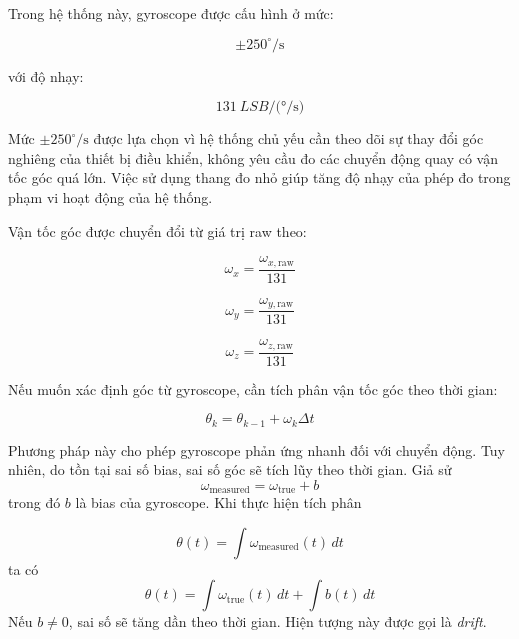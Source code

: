 Trong hệ thống này, gyroscope được cấu hình ở mức:

\begin{equation}
\pm 250^\circ/\text{s}
\end{equation}

với độ nhạy:

\begin{equation}
\qty{131}{LSB/(\degree/\second)}
\end{equation}

Mức $\pm 250^\circ/\text{s}$ được lựa chọn vì hệ thống chủ yếu cần theo dõi sự thay đổi góc nghiêng của thiết bị điều khiển, không yêu cầu đo các chuyển động quay có vận tốc góc quá lớn. Việc sử dụng thang đo nhỏ giúp tăng độ nhạy của phép đo trong phạm vi hoạt động của hệ thống.

Vận tốc góc được chuyển đổi từ giá trị raw theo:

\begin{equation}
\omega_x =
\frac{\omega_{x,\text{raw}}}{131}
\end{equation}

\begin{equation}
\omega_y =
\frac{\omega_{y,\text{raw}}}{131}
\end{equation}

\begin{equation}
\omega_z =
\frac{\omega_{z,\text{raw}}}{131}
\end{equation}

Nếu muốn xác định góc từ gyroscope, cần tích phân vận tốc góc theo thời gian:

\begin{equation}
\theta_k =
\theta_{k-1} +
\omega_k \Delta t
\end{equation}

Phương pháp này cho phép gyroscope phản ứng nhanh đối với chuyển động. Tuy nhiên, do tồn tại sai số bias, sai số góc sẽ tích lũy theo thời gian. Giả sử
\begin{equation}
\omega_{\text{measured}}
=
\omega_{\text{true}} + b
\end{equation}
trong đó $b$ là bias của gyroscope. Khi thực hiện tích phân

\begin{equation}
\theta(t)
=
\int
\omega_{\text{measured}}(t)\,dt
\end{equation}
ta có
\begin{equation}
\theta(t)
=
\int \omega_{\text{true}}(t)\,dt
+
\int b(t)\,dt
\end{equation}
Nếu $b \neq 0$, sai số sẽ tăng dần theo thời gian. Hiện tượng này được gọi là \textit{drift}.

